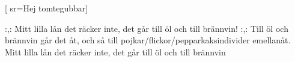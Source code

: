 [ 						
	sr={Hej tomtegubbar}]	
	
\beginverse*						
:,: Mitt lilla lån det räcker inte, det går till öl och till brännvin! :,:
Till öl och brännvin går det åt, 
och så till pojkar/flickor/pepparkaksindivider emellanåt.
Mitt lilla lån det räcker inte, 
det går till öl och till brännvin
\endverse				
\endsong		

